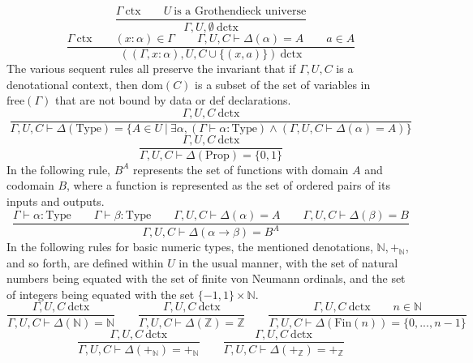 \documentclass[11pt]{article}
\begin{document}
\begin{equation}
	\frac{\Gamma\ \text{ctx}
	\qquad U\ \text{is a Grothendieck universe}}
	{\Gamma,U,\emptyset\ \text{dctx}}
\end{equation}
\begin{equation}
	\frac{\Gamma\ \text{ctx}
	\qquad (x : \alpha) \in \Gamma
	\qquad \Gamma,U,C \vdash \Delta(\alpha) = A
	\qquad a \in A}
	{((\Gamma, x : \alpha), U, C \cup \{(x,a)\})\ \text{dctx}}
\end{equation}
The various sequent rules all preserve the invariant
that if $\Gamma,U,C$ is a denotational context,
then $\text{dom}(C)$ is a subset of the set of variables
in $\text{free}(\Gamma)$ that are not bound by data or
def declarations.
\begin{equation}
	\frac{\Gamma,U,C\ \text{dctx}}
	{\Gamma,U,C \vdash \Delta(\text{Type}) =
	\{A \in U\ |\ \exists \alpha,
	(\Gamma \vdash \alpha : \text{Type})
	\wedge (\Gamma,U,C \vdash \Delta(\alpha) = A)\}}
\end{equation}
\begin{equation}
	\frac{\Gamma,U,C\ \text{dctx}}
	{\Gamma,U,C \vdash \Delta(\text{Prop}) = \{0,1\}}
\end{equation}
In the following rule, $B^A$ represents the set of functions
with domain $A$ and codomain $B$, where a function is represented
as the set of ordered pairs of its inputs and outputs.
\begin{equation}
	\frac{\Gamma \vdash \alpha : \text{Type}
	\qquad \Gamma \vdash \beta : \text{Type}
	\qquad \Gamma,U,C \vdash \Delta(\alpha) = A
	\qquad \Gamma,U,C \vdash \Delta(\beta) = B}
	{\Gamma,U,C \vdash \Delta(\alpha \to \beta) = B^A}
\end{equation}
In the following rules for basic numeric types, the mentioned denotations,
$\mathbb{N}, +_\mathbb{N}$, and so forth, are defined within $U$ in the usual
manner, with the set of natural numbers being equated with the set of
finite von Neumann ordinals, and the set of integers being equated with
the set $\{-1,1\} \times \mathbb{N}$.
\begin{equation}
	\frac{\Gamma,U,C\ \text{dctx}}
	{\Gamma,U,C \vdash \Delta(\mathbb{N}) = \mathbb{N}}
	\qquad
	\frac{\Gamma,U,C\ \text{dctx}}
	{\Gamma,U,C \vdash \Delta(\mathbb{Z}) = \mathbb{Z}}
	\qquad
	\frac{\Gamma,U,C\ \text{dctx}
	\qquad n \in \mathbb{N}}
	{\Gamma,U,C \vdash \Delta(\text{Fin}(n)) = \{0,...,n-1\}}
\end{equation}
\begin{equation}
	\frac{\Gamma,U,C\ \text{dctx}}
	{\Gamma,U,C \vdash \Delta(+_{\mathbb{N}}) = +_{\mathbb{N}}}
	\qquad
	\frac{\Gamma,U,C\ \text{dctx}}
	{\Gamma,U,C \vdash \Delta(+_{\mathbb{Z}}) = +_{\mathbb{Z}}}
\end{equation}
\end{document}
